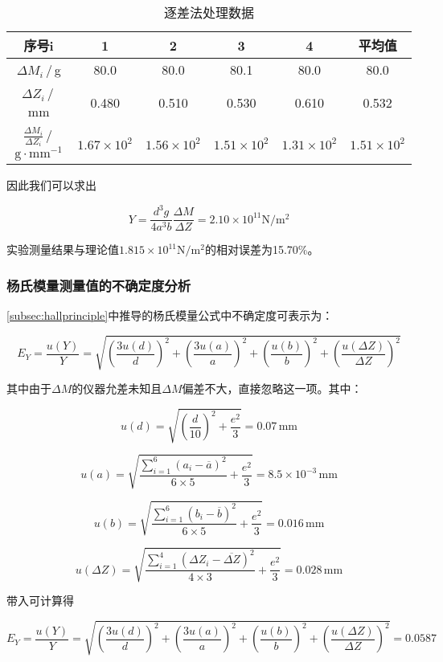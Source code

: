 \documentclass[12pt]{article}
\begin{document}
\begin{table}[htbp]
    \centering
    \begin{tabular}{|c|c|c|c|c|c|}
        \hline
        序号i & 1 & 2 & 3 & 4 & 平均值 \\
        \hline
        $\Delta M_i$\,/\,g & 80.0 & 80.0 & 80.1 & 80.0 & 80.0 \\
        \hline
        $\Delta Z_i$\,/\,mm & 0.480 & 0.510 & 0.530 & 0.610 & 0.532 \\
        \hline
        $\frac{\Delta M_i}{\Delta Z_i}$\,/\,$\mathrm{g\cdot mm^{-1}}$ & $1.67\times10^{2}$ & $1.56\times10^{2}$ & $1.51\times10^{2}$ & $1.31\times10^{2}$ & $1.51\times10^{2}$ \\
        \hline
    \end{tabular}
    \caption{逐差法处理数据}
\end{table}

因此我们可以求出

\[
    Y=\frac{d^3g}{4a^3b}\frac{\Delta M}{\Delta Z}=2.10\times10^{11}\mathrm{N/m^2}
\]

实验测量结果与理论值$1.815\times10^{11}\mathrm{N/m^2}$的相对误差为15.70\%。

\subsubsection{杨氏模量测量值的不确定度分析}\label{subsubsec:analysis2}

\ref{subsec:hallprinciple}中推导的杨氏模量公式中不确定度可表示为：

\[
    E_Y=\frac{u(Y)}{Y}=\sqrt{\left(\frac{3u(d)}{d}\right)^2+\left(\frac{3u(a)}{a}\right)^2+\left(\frac{u(b)}{b}\right)^2+\left(\frac{u(\Delta Z)}{\Delta Z}\right)^2}
\]

其中由于$\Delta M$的仪器允差未知且$\Delta M$偏差不大，直接忽略这一项。其中：

\[
    u(d)=\sqrt{\left(\frac{d}{10}\right)^2+\frac{e^2}{3}}=0.07\,\mathrm{mm}
\]

\[
    u(a)=\sqrt{\frac{\sum_{i=1}^{6}(a_i-\overline{a})^2}{6\times5}+\frac{e^2}{3}}=8.5\times10^{-3}\,\mathrm{mm}
\]

\[
    u(b)=\sqrt{\frac{\sum_{i=1}^{6}(b_i-\overline{b})^2}{6\times5}+\frac{e^2}{3}}=0.016\,\mathrm{mm}
\]

\[
    u(\Delta Z)=\sqrt{\frac{\sum_{i=1}^{4}(\Delta Z_i-\overline{\Delta Z})^2}{4\times3}+\frac{e^2}{3}}=0.028\,\mathrm{mm}
\]

带入可计算得

\[
    E_Y=\frac{u(Y)}{Y}=\sqrt{\left(\frac{3u(d)}{d}\right)^2+\left(\frac{3u(a)}{a}\right)^2+\left(\frac{u(b)}{b}\right)^2+\left(\frac{u(\Delta Z)}{\Delta Z}\right)^2}=0.0587
\]
\end{document}
